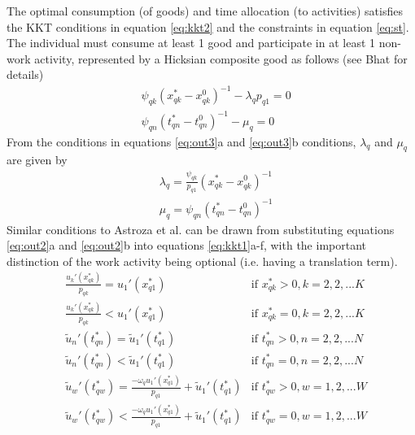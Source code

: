 The optimal consumption (of goods) and time allocation (to activities) satisfies the KKT conditions in equation \ref{eq:kkt2} and the constraints in equation \ref{eq:st}. The individual must consume at least 1 good and participate in at least 1 non-work activity, represented by a Hicksian composite good as follows (see Bhat \cite{Bhat2008TheExtensions} for details)
\begin{subequations}\label{eq:out1}
    \begin{align}
    &\psi_{qk}\left(x_{qk}^* - x_{qk}^0\right)^{-1} - \lambda_{q} p_{q1} = 0 \\
    &\psi_{qn}\left(t_{qn}^* - t_{qn}^0\right)^{-1} - \mu_{q} = 0 
    \end{align}
\end{subequations}
From the conditions in equations \ref{eq:out3}a and \ref{eq:out3}b conditions, $\lambda_{q}$ and $\mu_q$ are given by
\begin{subequations}\label{eq:out2}
    \begin{align}
    &\lambda_{q} = \frac{\psi_{qk}}{p_{q1}}\left(x_{qk}^* - x_{qk}^0\right)^{-1} \\
    &\mu_{q} = \psi_{qn}\left(t_{qn}^* - t_{qn}^0\right)^{-1}
    \end{align}
\end{subequations}
Similar conditions to Astroza et al. \cite{Astroza2017AConsumption} can be drawn from substituting equations \ref{eq:out2}a and \ref{eq:out2}b into equations \ref{eq:kkt1}a-f, with the important distinction of the work activity being optional (i.e. having a translation term).
\begin{subequations}\label{eq:kkt3}
    \begin{align}
        &\frac{u_k'\left(x_{qk}^*\right)}{p_{qk}} = u_1'\left(x_{q1}^*\right) & \text{if } x_{qk}^* > 0,k=2,2,...K \\
        &\frac{u_k'\left(x_{qk}^*\right)}{p_{qk}} < u_1'\left(x_{q1}^*\right) & \text{if } x_{qk}^* = 0,k=2,2,...K \\
        &\widetilde{u}_n'\left(t_{qn}^*\right) = \widetilde{u}_1'\left(t_{q1}^*\right) & \text{if } t_{qn}^* > 0,n=2,2,...N \\
        &\widetilde{u}_n'\left(t_{qn}^*\right) < \widetilde{u}_1'\left(t_{q1}^*\right) & \text{if } t_{qn}^* = 0,n=2,2,...N \\
        &\widetilde{u}_w'\left(t_{qw}^*\right) = \frac{-\omega_q u_1'\left(x_{q1}^*\right)}{p_{q1}}  + \widetilde{u}_1'\left(t_{q1}^*\right) & \text{if } t_{qw}^* > 0,w=1,2,...W \\
        &\widetilde{u}_w'\left(t_{qw}^*\right) < \frac{-\omega_q u_1'\left(x_{q1}^*\right)}{p_{q1}}  + \widetilde{u}_1'\left(t_{q1}^*\right) & \text{if } t_{qw}^* = 0,w=1,2,...W
    \end{align}
\end{subequations}


